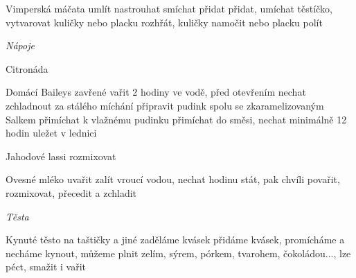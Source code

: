 \documentclass[12pt,a4paper]{article}
\begin{document}
\begin{recipe}{Vimperská máčata}
   umlít
   nastrouhat
   smíchat
   přidat
   přidat, umíchat těstíčko, vytvarovat kuličky nebo placku
   rozhřát, kuličky namočit nebo placku polít
\end{recipe}
\newpage

\vspace*{\fill}
\hfill {\Huge\it Nápoje}\hfill
\vspace*{\fill}
\newpage

\begin{recipe}{Citronáda}
\end{recipe}
\newpage

\begin{recipe}{Domácí Baileys}
   zavřené vařit 2 hodiny ve vodě, před otevřením nechat zchladnout
   za stálého míchání připravit pudink
   spolu se zkaramelizovaným Salkem přimíchat k vlažnému pudinku
   přimíchat do směsi, nechat minimálně 12 hodin uležet v lednici
\end{recipe}
\newpage

\begin{recipe}{Jahodové lassi}
   rozmixovat
\end{recipe}
\newpage

\begin{recipe}{Ovesné mléko}
   uvařit
   zalít vroucí vodou, nechat hodinu stát, pak chvíli povařit, rozmixovat, přecedit a zchladit
\end{recipe}
\newpage

\vspace*{\fill}
\hfill {\Huge\it Těsta}\hfill
\vspace*{\fill}
\newpage

\begin{recipe}{Kynuté těsto na taštičky a jiné}
   zaděláme kvásek
   přidáme kvásek, promícháme a necháme kynout, můžeme plnit zelím, sýrem, pórkem, tvarohem, čokoládou..., lze péct, smažit i vařit
\end{recipe}
\newpage
\end{document}
